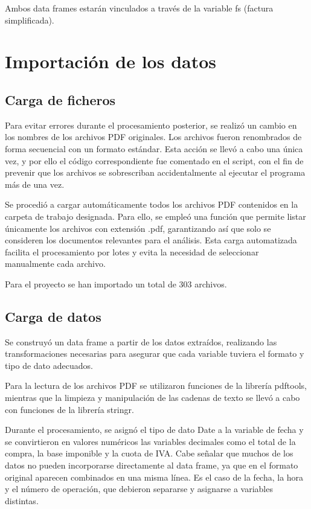 \documentclass[,article,submit,moreauthors,pdftex]{Definitions/mdpi}
\begin{document}
Ambos data frames estarán vinculados a través de la variable fs (factura
simplificada).

\hypertarget{importaciuxf3n-de-los-datos}{%
\section{Importación de los datos}\label{importaciuxf3n-de-los-datos}}

\hypertarget{carga-de-ficheros}{%
\subsection{Carga de ficheros}\label{carga-de-ficheros}}

Para evitar errores durante el procesamiento posterior, se realizó un
cambio en los nombres de los archivos PDF originales. Los archivos
fueron renombrados de forma secuencial con un formato estándar. Esta
acción se llevó a cabo una única vez, y por ello el código
correspondiente fue comentado en el script, con el fin de prevenir que
los archivos se sobrescriban accidentalmente al ejecutar el programa más
de una vez.

Se procedió a cargar automáticamente todos los archivos PDF contenidos
en la carpeta de trabajo designada. Para ello, se empleó una función que
permite listar únicamente los archivos con extensión .pdf, garantizando
así que solo se consideren los documentos relevantes para el análisis.
Esta carga automatizada facilita el procesamiento por lotes y evita la
necesidad de seleccionar manualmente cada archivo.

Para el proyecto se han importado un total de 303 archivos.

\hypertarget{carga-de-datos}{%
\subsection{Carga de datos}\label{carga-de-datos}}

Se construyó un data frame a partir de los datos extraídos, realizando
las transformaciones necesarias para asegurar que cada variable tuviera
el formato y tipo de dato adecuados.

Para la lectura de los archivos PDF se utilizaron funciones de la
librería pdftools, mientras que la limpieza y manipulación de las
cadenas de texto se llevó a cabo con funciones de la librería stringr.

Durante el procesamiento, se asignó el tipo de dato Date a la variable
de fecha y se convirtieron en valores numéricos las variables decimales
como el total de la compra, la base imponible y la cuota de IVA. Cabe
señalar que muchos de los datos no pueden incorporarse directamente al
data frame, ya que en el formato original aparecen combinados en una
misma línea. Es el caso de la fecha, la hora y el número de operación,
que debieron separarse y asignarse a variables distintas.
\end{document}
